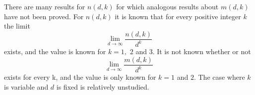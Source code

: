 \documentclass[11pt]{article}
\theoremstyle{definition}
\begin{document}
There are many results for $n(d,k)$ for which analogous results about $m(d,k)$ have not been proved.
For $n(d,k)$ it is known that for every positive integer $k$ the limit 
\[
\lim_{d \to \infty}{\frac{n(d,k)}{d^k}}
\]
exists, and the value is known for $k = 1,$ $2$ and $3$.  It is not known whether or not 
\[
\lim_{d \to \infty}{\frac{m(d,k)}{d^k}}
\]
exists for every k, and the value is only known for $k = 1$ and $2$. The case where $k$ is variable and $d$ is fixed is relatively unstudied.

\newpage
	
		
\end{document}
